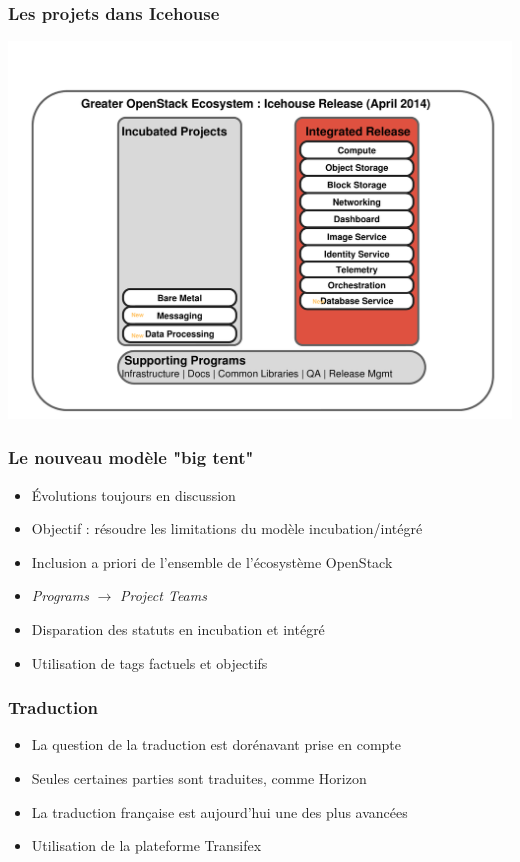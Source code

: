   \begin{frame}
    \frametitle{Les projets dans Icehouse}
    \includegraphics[width=\textwidth]{images/innovation2.pdf}
  \end{frame}

  \begin{frame}
    \frametitle{Le nouveau modèle "big tent"}
    \begin{itemize}
      \item Évolutions toujours en discussion
      \item Objectif : résoudre les limitations du modèle incubation/intégré
      \item Inclusion {a priori} de l'ensemble de l'écosystème OpenStack
      \item \textit{Programs} $\rightarrow$ \textit{Project Teams}
      \item Disparation des statuts en incubation et intégré
      \item Utilisation de tags factuels et objectifs
    \end{itemize}
  \end{frame}

  \begin{frame}
    \frametitle{Traduction}
    \begin{itemize}
      \item La question de la traduction est dorénavant prise en compte
      \item Seules certaines parties sont traduites, comme Horizon
      \item La traduction française est aujourd'hui une des plus avancées
      \item Utilisation de la plateforme Transifex
    \end{itemize}
  \end{frame}

